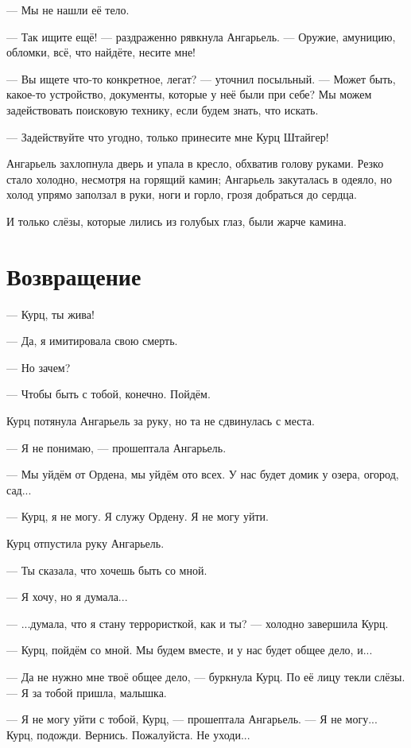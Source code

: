 --- Мы не нашли её тело.

--- Так ищите ещё! --- раздраженно рявкнула Ангарьель.
--- Оружие, амуницию, обломки, всё, что найдёте, несите мне!

--- Вы ищете что-то конкретное, легат? --- уточнил посыльный.
--- Может быть, какое-то устройство, документы, которые у неё были при себе?
Мы можем задействовать поисковую технику, если будем знать, что искать.

--- Задействуйте что угодно, только принесите мне Курц Штайгер!

Ангарьель захлопнула дверь и упала в кресло, обхватив голову руками.
Резко стало холодно, несмотря на горящий камин;
Ангарьель закуталась в одеяло, но холод упрямо заползал в руки, ноги и горло, грозя добраться до сердца.

И только слёзы, которые лились из голубых глаз, были жарче камина.

\section{Возвращение}

--- Курц, ты жива!

--- Да, я имитировала свою смерть.

--- Но зачем?

--- Чтобы быть с тобой, конечно.
Пойдём.

Курц потянула Ангарьель за руку, но та не сдвинулась с места.

--- Я не понимаю, --- прошептала Ангарьель.

--- Мы уйдём от Ордена, мы уйдём ото всех.
У нас будет домик у озера, огород, сад...

--- Курц, я не могу.
Я служу Ордену.
Я не могу уйти.

Курц отпустила руку Ангарьель.

--- Ты сказала, что хочешь быть со мной.

--- Я хочу, но я думала...

--- ...думала, что я стану террористкой, как и ты? --- холодно завершила Курц.

--- Курц, пойдём со мной.
Мы будем вместе, и у нас будет общее дело, и...

--- Да не нужно мне твоё общее дело, --- буркнула Курц.
По её лицу текли слёзы.
--- Я за тобой пришла, малышка.

--- Я не могу уйти с тобой, Курц, --- прошептала Ангарьель.
--- Я не могу...
Курц, подожди.
Вернись.
Пожалуйста.
Не уходи...

